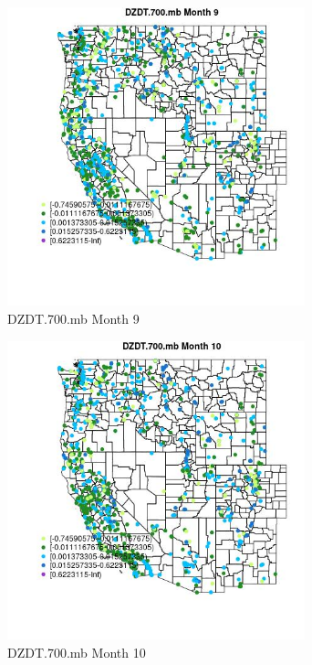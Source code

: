 \begin{figure} 
\centering  
\includegraphics[width=0.77\textwidth]{Code_Outputs/Report_ML_input_PM25_Step4_part_f_de_duplicated_aves_prioritize_24hr_obswNAs_MapObsMo9DZDT700mb.jpg} 
\caption{\label{fig:Report_ML_input_PM25_Step4_part_f_de_duplicated_aves_prioritize_24hr_obswNAsMapObsMo9DZDT700mb}DZDT.700.mb Month 9} 
\end{figure} 
 

\begin{figure} 
\centering  
\includegraphics[width=0.77\textwidth]{Code_Outputs/Report_ML_input_PM25_Step4_part_f_de_duplicated_aves_prioritize_24hr_obswNAs_MapObsMo10DZDT700mb.jpg} 
\caption{\label{fig:Report_ML_input_PM25_Step4_part_f_de_duplicated_aves_prioritize_24hr_obswNAsMapObsMo10DZDT700mb}DZDT.700.mb Month 10} 
\end{figure} 
 

